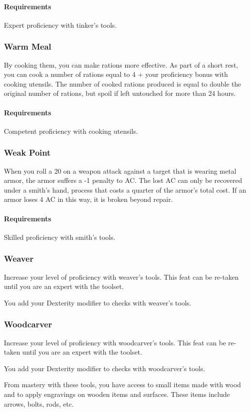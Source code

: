     \paragraph{Requirements} Expert proficiency with tinker's tools.
\subsubsection{Warm Meal} \label{feat::warmmeal}
    By cooking them, you can make rations more effective.
    As part of a short rest, you can cook a number of rations equal to 4 + your proficiency bonus with cooking utensils.
    The number of cooked rations produced is equal to double the original number of rations, but spoil if left untouched for more than 24 hours.
    \paragraph{Requirements} Competent proficiency with cooking utensils.
\subsubsection{Weak Point} \label{feat::weakpoint}
    When you roll a 20 on a weapon attack against a target that is wearing metal armor, the armor suffers a -1 penalty to AC.
    The lost AC can only be recovered under a smith's hand, process that costs a quarter of the armor's total cost.
    If an armor loses 4 AC in this way, it is broken beyond repair.
    \paragraph{Requirements} Skilled proficiency with smith's tools.
\subsubsection{Weaver} \label{feat::weaver}
    Increase your level of proficiency with weaver's tools.
    This feat can be re-taken until you are an expert with the toolset.

    You add your Dexterity modifier to checks with weaver's tools.
\subsubsection{Woodcarver} \label{feat::woodcarver}
    Increase your level of proficiency with woodcarver's tools.
    This feat can be re-taken until you are an expert with the toolset.

    You add your Dexterity modifier to checks with woodcarver's tools.

    From mastery with these tools, you have access to small items made with wood and to apply engravings on wooden items and surfaces.
    These items include arrows, bolts, rods, etc.
\newpage
